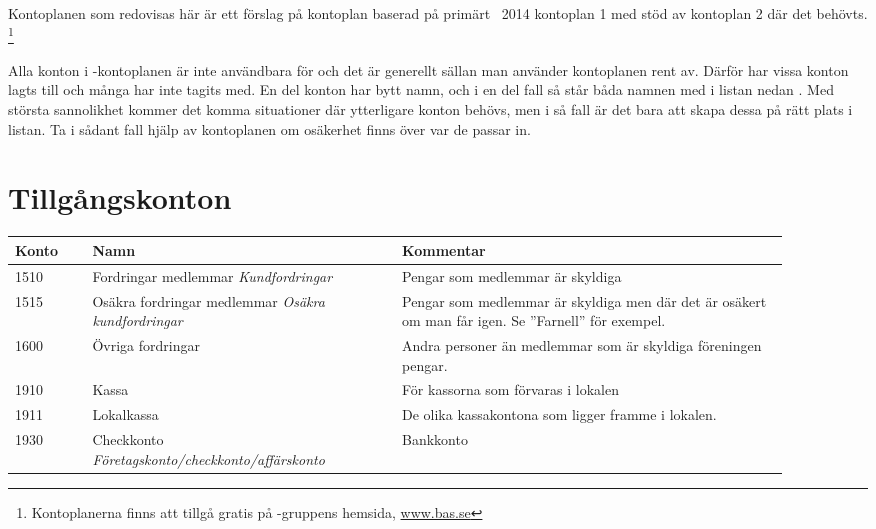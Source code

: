 Kontoplanen som redovisas här är ett förslag på kontoplan baserad på primärt ~2014 kontoplan 1 med stöd av kontoplan 2 där det behövts. \footnote{Kontoplanerna finns att tillgå gratis på -gruppens hemsida, \url{www.bas.se}}

Alla konton i -kontoplanen är inte användbara för  och det är generellt sällan man använder kontoplanen rent av. 
Därför har vissa konton lagts till och många har inte tagits med. En del konton har bytt namn, och i en del fall så står båda namnen med i listan nedan . Med största sannolikhet kommer det komma situationer där ytterligare konton behövs, men i så fall är det bara att skapa dessa på rätt plats i listan. Ta i sådant fall hjälp av  kontoplanen om osäkerhet finns över var de passar in.


\section{Tillgångskonton}
\begin{minipage}{\fullwidthlength}
	\begin{longtable}[l]{l p{0.4\linewidth} p{0.5\linewidth}}
		Konto	&	Namn								& Kommentar \\ \toprule \endhead
		1510	&	Fordringar medlemmar \newline \emph{Kundfordringar} & Pengar som medlemmar är skyldiga \acr{eta}\\
		1515	&	Osäkra fordringar medlemmar \newline \emph{Osäkra kundfordringar}	& Pengar som medlemmar är skyldiga men där det är osäkert om man får igen. \newline Se ”Farnell” för exempel.\\
		1600	&	Övriga fordringar					& Andra personer än medlemmar som är skyldiga föreningen pengar.\\
		1910	&	Kassa								& För kassorna som förvaras i lokalen\\
		1911	&	Lokalkassa							& De olika kassakontona som ligger framme i lokalen.\\
		1930	&	Checkkonto \newline \emph{Företagskonto/checkkonto/affärskonto}	& Bankkonto\\
	\end{longtable}
\end{minipage}


